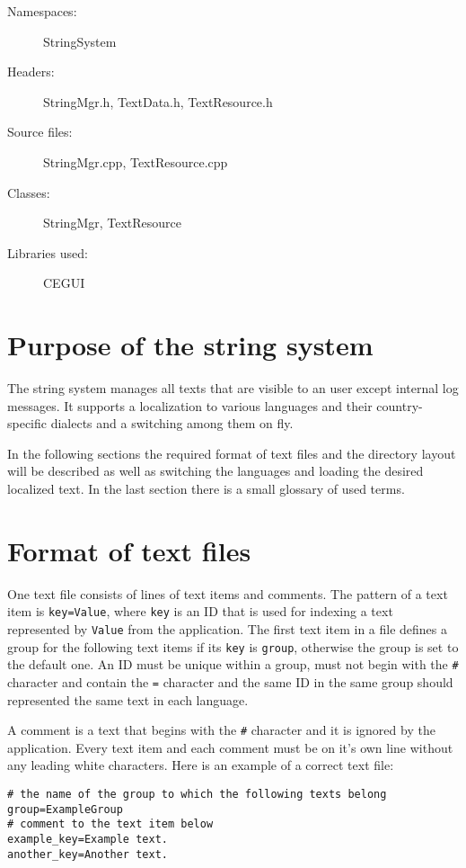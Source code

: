 \begin{description}
  \item[Namespaces:] StringSystem
  \item[Headers:] StringMgr.h, TextData.h, TextResource.h
  \item[Source files:] StringMgr.cpp, TextResource.cpp
  \item[Classes:] StringMgr, TextResource
  \item[Libraries used:] CEGUI
\end{description}

\section{Purpose of the string system}

The string system manages all texts that are visible to an user except internal log messages. It supports a localization to various languages and their country-specific dialects and a switching among them on fly.

In the following sections the required format of text files and the directory layout will be described as well as switching the languages and loading the desired localized text. In the last section there is a small glossary of used terms.

\section{Format of text files}

One text file consists of lines of text items and comments. The pattern of a text item is \verb/key=Value/, where \verb/key/ is an ID that is used for indexing a text represented by \verb/Value/ from the application. The first text item in a file defines a group for the following text items if its \verb/key/ is \verb/group/, otherwise the group is set to the default one. An ID must be unique within a group, must not begin with the \verb/#/ character and contain the \verb/=/ character and the same ID in the same group should represented the same text in each language.

A comment is a text that begins with the \verb/#/ character and it is ignored by the application. Every text item and each comment must be on it's own line without any leading white characters. Here is an example of a correct text file:

\begin{verbatim}
# the name of the group to which the following texts belong
group=ExampleGroup
# comment to the text item below
example_key=Example text.
another_key=Another text.
\end{verbatim}

